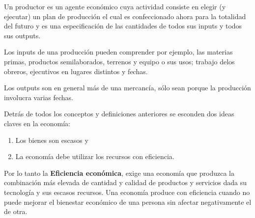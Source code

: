 Un productor es un agente económico cuya actividad consiste en elegir (y ejecutar) un plan de producción el cual es confeccionado ahora para la totalidad del futuro y es una especificación de las cantidades de todos sus inputs y todos sus outputs.

Los inputs de una producción pueden comprender por ejemplo, las materias primas, productos semilaborados, terrenos y equipo o sus usos; trabajo delos obreros, ejecutivos en lugares distintos y fechas.

Los outputs son en general más de una mercancía, sólo sean porque la producción involucra varias fechas.

Detrás de todos los conceptos y definiciones anteriores se esconden dos ideas claves en la economía:
\begin{enumerate}
    \item Los bienes son escasos y 
    \item La economía debe utilizar los recursos con eficiencia.
\end{enumerate}
Por lo tanto la \textbf{Eficiencia económica}, exige una economía que produzca la combinación más elevada de cantidad y calidad de productos y servicios dada su tecnología y sus escasos recursos. Una economía produce con eficiencia cuando no puede mejorar el bienestar económico de una persona sin afectar negativamente el de otra.

